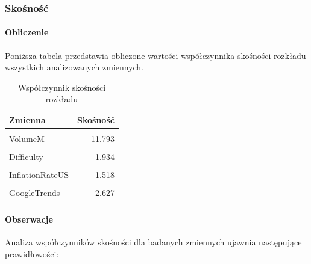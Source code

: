 \documentclass[
  11pt,
]{article}
\begin{document}
\pagebreak

\subsubsection{Skośność}\label{skoux15bnoux15bux107}

\paragraph{\texorpdfstring{Obliczenie
\newline}{Obliczenie }}\label{obliczenie}

Poniższa tabela przedstawia obliczone wartości współczynnika skośności
rozkładu wszystkich analizowanych zmiennych.

\begin{table}[!h]
\centering
\caption{\label{tab:unnamed-chunk-5}Współczynnik skośności rozkładu}
\centering
\begin{tabular}[t]{lr}
\toprule
Zmienna & Skośność\\
\midrule
\cellcolor{gray!10}{Price} & \cellcolor{gray!10}{1.706}\\
VolumeM & 11.793\\
\cellcolor{gray!10}{USAvgKWHPrice} & \cellcolor{gray!10}{1.243}\\
Difficulty & 1.934\\
\cellcolor{gray!10}{BTCCirculation} & \cellcolor{gray!10}{-0.991}\\
\addlinespace
InflationRateUS & 1.518\\
\cellcolor{gray!10}{HasMuskMentioned} & \cellcolor{gray!10}{4.892}\\
GoogleTrends & 2.627\\
\bottomrule
\end{tabular}
\end{table}

\paragraph{Obserwacje}\label{obserwacje-3}

Analiza współczynników skośności dla badanych zmiennych ujawnia
następujące prawidłowości:
\end{document}
